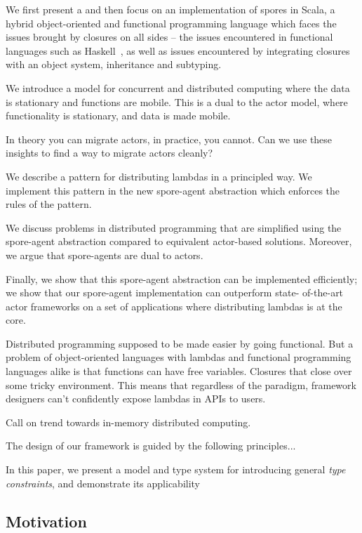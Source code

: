 \documentclass{llncs}
\begin{document}
We first present a and then focus on an implementation of spores in Scala, a
hybrid object-oriented and functional programming language which faces the
issues brought by closures on all sides -- the issues encountered in
functional languages such as Haskell~\cite{CloudHaskell}, as well as issues
encountered by integrating closures with an object system, inheritance and
subtyping.


We introduce a model for concurrent and distributed computing where the data is stationary and functions are mobile. This is a dual to the actor model, where functionality is stationary, and data is made mobile. 

In theory you can migrate actors, in practice, you cannot. Can we use these insights to find a way to migrate actors cleanly?

We describe a pattern for distributing lambdas in a principled way. We
implement this pattern in the new spore-agent abstraction which enforces the
rules of the pattern.

We discuss problems in distributed programming that are simplified using the
spore-agent abstraction compared to equivalent actor-based solutions.
Moreover, we argue that spore-agents are dual to actors.

Finally, we show that this spore-agent abstraction can be implemented
efficiently; we show that our spore-agent implementation can outperform state-
of-the-art actor frameworks on a set of applications where distributing
lambdas is at the core.

Distributed programming supposed to be made easier by going functional. But a problem of object-oriented languages with lambdas and functional programming languages alike is that functions can have free variables. Closures that close over some tricky environment. This means that regardless of the paradigm, framework designers can't confidently expose lambdas in APIs to users.

Call on trend towards in-memory distributed computing.

The design of our framework is guided by the following principles...

In this paper, we present a model and type system for introducing general {\em type constraints}, and demonstrate its applicability 

\subsection{Motivation}
\end{document}
